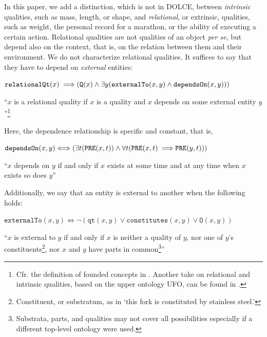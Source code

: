 \documentclass[sw]{iosart2x}
\newcommand{\bflist}{\begin{list}{}{\setlength{\topsep}{2mm}\setlength{\partopsep}{0mm}\setlength{\parsep}{0mm}\setlength{\leftmargin}{9mm}\setlength{\labelwidth}{8mm}}}
\newcommand{\eflist}{\end{list}}
\newcommand{\AxLabel}{\textrm{a}}
\newcommand{\DefLabel}{\textrm{d}}
\newcounter{cntax}
\newcommand{\myax}[1]{\refstepcounter{cntax}\begin{small}{\bf \AxLabel\thecntax\label{ax:#1}}\end{small}}
\newcounter{cntdef}
\newcommand{\mydf}[1]{\refstepcounter{cntdef}\begin{small}{\bf \DefLabel\thecntdef\label{def:#1}}\end{small}}
\newcommand{\mytext}[1]{``#1''}
\newcommand{\generalStyle}[1]{\texttt{#1}}
\newcommand{\biRel}[3]{\generalStyle{#1}(#2,#3)}
\newcommand{\uniRel}[2]{\generalStyle{#1}(#2)}
\newcommand{\triRel}[4]{\generalStyle{#1}(#2,#3,#4)}
\newcommand{\myiff}{\Longleftrightarrow}
\newcommand{\myfi}{\hspace{0.9mm} \Longrightarrow}
\newcommand{\DOLCE}{\textsc{DOLCE}\xspace} %
\newcommand{\DOLCEQuality}[1]{\uniRel{Q}{#1}}
\newcommand{\DOLCEPart}[3]{\triRel{{P}}{#1}{#2}{#3}}
\newcommand{\DOLCEOver}[2]{\biRel{{O}}{#1}{#2}}
\newcommand{\DOLCEConstitutes}[2]{\biRel{{constitutes}}{#1}{#2}}
\newcommand{\DOLCEQualityDirect}[2]{\biRel{qt}{#1}{#2}}
\newcommand{\DOLCEPRE}[2]{\biRel{PRE}{#1}{#2}}
\newcommand{\RelationalQuality}[1]{\uniRel{relationalQt}{#1}}
\newcommand{\specificallyDependsOn}[2]{\biRel{dependsOn}{#1}{#2}}
\newcommand{\external}[2]{\biRel{externalTo}{#1}{#2}}
\newcommand{\internal}[2]{\biRel{internalTo}{#1}{#2}}
\newcommand{\firstTimeKeyWord}[1]{\textit{#1}}
\newcommand{\quotes}[1]{`#1'}
\newcommand{\TODO}[1]{{\color{red} #1}}
\begin{document}
In this paper, we add a distinction, which is not in \DOLCE, between \firstTimeKeyWord{intrinsic} qualities, such as mass, length, or shape, and \firstTimeKeyWord{relational}, or extrinsic, qualities, such as weight, the personal record for a marathon, or the ability of executing a certain action. 
Relational qualities are not qualities of an object \textit{per se}, but depend also on the context, that is, on the relation between them and their environment.
We do not characterize relational qualities. It suffices to say that they have to depend on \firstTimeKeyWord{external} entities: 
\bflist
  \item[\myax{relationalQtPartialDef}] $ \RelationalQuality{x} \myfi  ( \DOLCEQuality{x} \land \exists y(\external{x}{y} \land \specificallyDependsOn{x}{y}))$%
  \item[] \mytext{$x$ is a relational quality if $x$ is a quality and $x$ depends on some external entity $y$}\footnote{Cfr. the definition of founded concepts in \cite{masoloSocialRolesTheir2004}. Another take on relational and intrinsic qualities, based on the upper ontology UFO, can be found in \cite{fonsecaRelationsOntologyDrivenConceptual2019}.}
\eflist
  
  Here, the dependence relationship is specific and constant, that is,
\bflist
  \item[\mydf{specificallyDependsOn}] $ \specificallyDependsOn{x}{y} \myiff (\exists t(\DOLCEPRE{x}{t}) \land \forall t(\DOLCEPRE{x}{t} \myfi \DOLCEPRE{y}{t}))$ 
  \item[] \mytext{$x$ depends on $y$ if and only if $x$ exists at some time and at any time when $x$ exists so does $y$}
\eflist
  
Additionally, we say that an entity is external to another when the following holds:
\bflist
  \item[\mydf{external}] $ \external{x}{y} \myiff \neg (\DOLCEQualityDirect{x}{y} \lor \DOLCEConstitutes{x}{y} \lor %
  \DOLCEOver{x}{y})$
  \item[] \mytext{$x$ is external to $y$ if and only if $x$ is neither a quality of $y$, nor one of $y$'s constituents\footnote{Constituent, or substratum, as in \quotes{this fork is constituted by stainless steel.}}, nor $x$ and $y$ have parts in common\footnote{Substrata, parts, and qualities may not cover all possibilities especially if a different top-level ontology were used.}}  
\eflist
\end{document}
